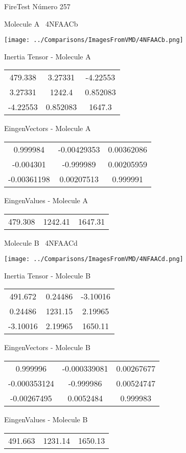 \vtab[-3cm]
\begin{center}
{\large FireTest \tab Número 257}
\end{center}
\begin{multicols}{2}
\begin{center}

Molecule A \
4NFAACb

\texttt{[image: ../Comparisons/ImagesFromVMD/4NFAACb.png]}

Inertia Tensor - Molecule A \\
\begin{tabular}{|c c c|}
479.338	 & 	3.27331	 & 	-4.22553	 \\
3.27331	 & 	1242.4	 & 	0.852083	 \\
-4.22553	 & 	0.852083	 & 	1647.3
\end{tabular}

\vtab
 EingenVectors - Molecule A     \\
\begin{tabular}{|c c c|}
0.999984	 & 	-0.00429353	 & 	0.00362086	 \\
-0.004301	 & 	-0.999989	 & 	0.00205959	 \\
-0.00361198	 & 	0.00207513	 & 	0.999991
\end{tabular}

\vtab
 EingenValues - Molecule A     \\
\begin{tabular}{|c c c|}
479.308	 & 	1242.41	 & 	1647.31	 \\
\end{tabular}
\columnbreak

Molecule B \
4NFAACd

\texttt{[image: ../Comparisons/ImagesFromVMD/4NFAACd.png]}

Inertia Tensor - Molecule B \\
\begin{tabular}{|c c c|}
491.672	 & 	0.24486	 & 	-3.10016	 \\
0.24486	 & 	1231.15	 & 	2.19965	 \\
-3.10016	 & 	2.19965	 & 	1650.11
\end{tabular}

\vtab
 EingenVectors - Molecule B     \\
\begin{tabular}{|c c c|}
0.999996	 & 	-0.000339081	 & 	0.00267677	 \\
-0.000353124	 & 	-0.999986	 & 	0.00524747	 \\
-0.00267495	 & 	0.0052484	 & 	0.999983
\end{tabular}

\vtab
 EingenValues - Molecule B     \\
\begin{tabular}{|c c c|}
491.663	 & 	1231.14	 & 	1650.13	 \\
\end{tabular}

\end{center}
\end{multicols}

